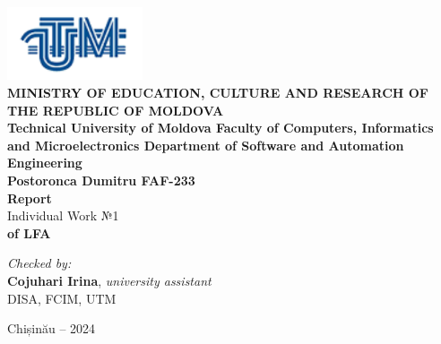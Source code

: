 \documentclass[12pt]{article}
\begin{document}
\begin{titlepage}
\begin{center}
    \includegraphics[width=0.3\textwidth]{image.png} \\[0.2cm]
    
    \textbf{MINISTRY OF EDUCATION, CULTURE AND RESEARCH 
OF THE REPUBLIC OF MOLDOVA} \\[0.3cm]
    
    \textbf{Technical University of Moldova 
Faculty of Computers, Informatics and Microelectronics 
Department of Software and Automation Engineering} \\[2cm]
    
    \textbf{Postoronca Dumitru FAF-233}\\[0.5cm]
    
    \Huge \textbf{Report} \\[0.5cm]
    
    \large Individual Work №1\\[0.5cm]
    
    \textbf{of LFA} \\[3cm]
    
    \begin{flushright}
        \textit{Checked by:} \\
        \textbf{Cojuhari Irina}, \textit{university assistant} \\
        DISA, FCIM, UTM
    \end{flushright}
    
    \vfill
    
    Chișinău -- 2024
\end{center}
\end{titlepage}


\newpage
\setcounter{page}{1}
\pagestyle{fancy}
\fancyhf{}
\rhead{\thepage}
\end{document}
